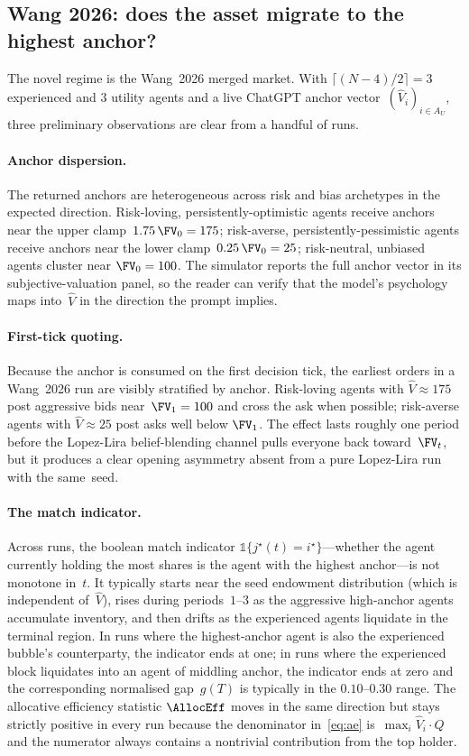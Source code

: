 \subsection{Wang 2026: does the asset migrate to the highest anchor?}

The novel regime is the Wang~2026 merged market. With
$\lceil(N-4)/2\rceil=3$ experienced and $3$ utility agents and a
live ChatGPT anchor vector~$(\hat V_i)_{i\in A_U}$, three
preliminary observations are clear from a handful of runs.

\paragraph{Anchor dispersion.} The returned anchors are
heterogeneous across risk and bias archetypes in the expected
direction. Risk-loving, persistently-optimistic agents receive
anchors near the upper clamp~$1.75\,\FV_0=175$; risk-averse,
persistently-pessimistic agents receive anchors near the lower
clamp~$0.25\,\FV_0=25$; risk-neutral, unbiased agents cluster near
$\FV_0=100$. The simulator reports the full anchor vector in its
subjective-valuation panel, so the reader can verify that the
model's psychology maps into~$\hat V$ in the direction the prompt
implies.

\paragraph{First-tick quoting.} Because the anchor is consumed on
the first decision tick, the earliest orders in a Wang~2026 run
are visibly stratified by anchor. Risk-loving agents with
$\hat V\approx175$ post aggressive bids near~$\FV_1=100$ and
cross the ask when possible; risk-averse agents with
$\hat V\approx 25$ post asks well below $\FV_1$. The effect lasts
roughly one period before the Lopez-Lira belief-blending channel
pulls everyone back toward~$\FV_t$, but it produces a clear
opening asymmetry absent from a pure Lopez-Lira run with the same~seed.

\paragraph{The match indicator.} Across runs, the boolean
match indicator
$\mathbb{1}\{j^\star(t)=i^\star\}$---whether the agent currently
holding the most shares is the agent with the highest anchor---is
not monotone in~$t$. It typically starts near the seed endowment
distribution (which is independent of~$\hat V$), rises during
periods~$1$--$3$ as the aggressive high-anchor agents accumulate
inventory, and then drifts as the experienced agents liquidate in
the terminal region. In runs where the highest-anchor agent is
also the experienced bubble's counterparty, the indicator ends at
one; in runs where the experienced block liquidates into an agent
of middling anchor, the indicator ends at zero and the
corresponding normalised gap~$g(T)$ is typically in the
$0.10$--$0.30$ range. The allocative efficiency statistic $\AllocEff$
moves in the same direction but stays strictly positive in every
run because the denominator in~\eqref{eq:ae} is~$\max_i\hat
V_i\cdot Q$ and the numerator always contains a nontrivial
contribution from the top holder.

